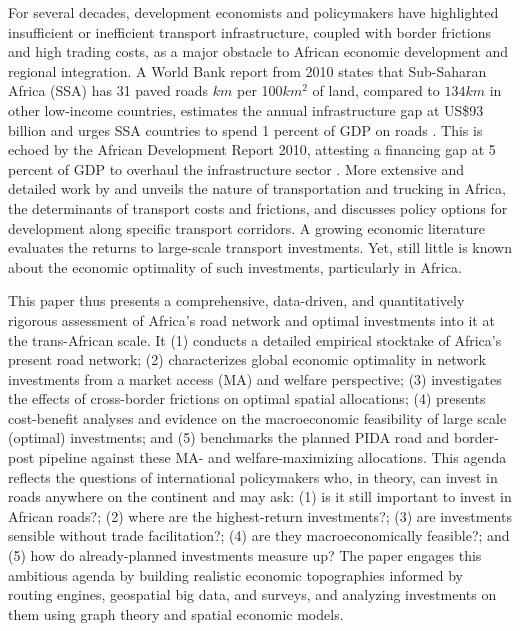 \documentclass[a4paper]{article}
\begin{document}
For several decades, development economists and policymakers have highlighted insufficient or inefficient transport infrastructure, coupled with border frictions and high trading costs, as a major obstacle to African economic development and regional integration. A World Bank report from 2010 states that Sub-Saharan Africa (SSA) has 31 paved roads $km$ per 100$km^2$ of land, compared to $134km$ in other low-income countries, estimates the annual infrastructure gap at US\$93 billion and urges SSA countries to spend 1 percent of GDP on roads \citep{foster2010africa}. This is echoed by the African Development Report 2010, attesting a financing gap at 5 percent of GDP to overhaul the infrastructure sector \citep{ADB2010african}. More extensive and detailed work by \citet{teravaninthorn2009transport} and \citet{lamarque2022transport} unveils the nature of transportation and trucking in Africa, the determinants of transport costs and frictions, and discusses policy options for development along specific transport corridors. A growing economic literature evaluates the returns to large-scale transport investments. Yet, still little is known about the economic optimality of such investments, particularly in Africa. \newline 

This paper thus presents a comprehensive, data-driven, and quantitatively rigorous assessment of Africa's road network and optimal investments into it at the trans-African scale. It (1) conducts a detailed empirical stocktake of Africa's present road network; (2) characterizes global economic optimality in network investments from a market access (MA) and welfare perspective; (3) investigates the effects of cross-border frictions on optimal spatial allocations; (4) presents cost-benefit analyses and evidence on the macroeconomic feasibility of large scale (optimal) investments; and (5) benchmarks the planned PIDA road and border-post pipeline against these MA- and welfare-maximizing allocations. This agenda reflects the questions of international policymakers who, in theory, can invest in roads anywhere on the continent and may ask: (1) is it still important to invest in African roads?; (2) where are the highest-return investments?; (3) are investments sensible without trade facilitation?; (4) are they macroeconomically feasible?; and (5) how do already-planned investments measure up? The paper engages this ambitious agenda by building realistic economic topographies informed by routing engines, geospatial big data, and surveys, and analyzing investments on them using graph theory and spatial economic models. \newline
\end{document}
